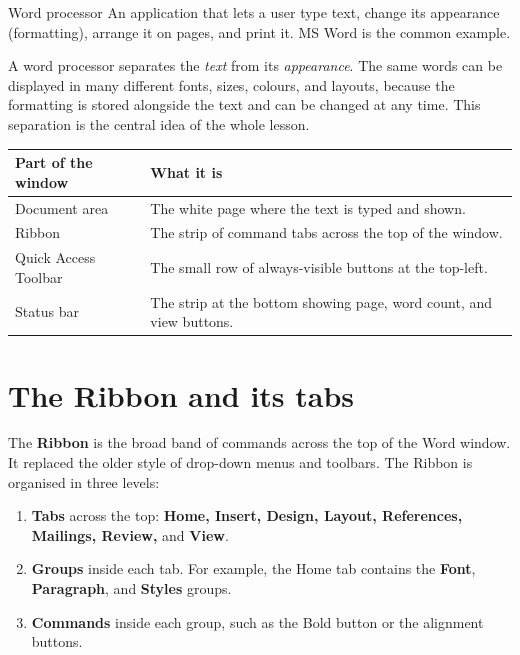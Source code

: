\begin{definitionbox}{Word processor}
An application that lets a user type text, change its appearance
(formatting), arrange it on pages, and print it. MS Word is the common
example.
\end{definitionbox}

A word processor separates the \emph{text} from its \emph{appearance}. The
same words can be displayed in many different fonts, sizes, colours, and
layouts, because the formatting is stored alongside the text and can be
changed at any time. This separation is the central idea of the whole
lesson.

\begin{center}
\begin{tabular}{p{}p{}}
\toprule
\textbf{Part of the window} & \textbf{What it is} \\
\midrule
Document area & The white page where the text is typed and shown. \\
Ribbon & The strip of command tabs across the top of the window. \\
Quick Access Toolbar & The small row of always-visible buttons at the top-left. \\
Status bar & The strip at the bottom showing page, word count, and view buttons. \\
\bottomrule
\end{tabular}
\end{center}

\section{The Ribbon and its tabs}
The \textbf{Ribbon} is the broad band of commands across the top of the Word
window. It replaced the older style of drop-down menus and toolbars. The
Ribbon is organised in three levels:

\begin{enumerate}
  \item \textbf{Tabs} across the top: \textbf{Home, Insert, Design, Layout,
    References, Mailings, Review,} and \textbf{View}.
  \item \textbf{Groups} inside each tab. For example, the Home tab contains
    the \textbf{Font}, \textbf{Paragraph}, and \textbf{Styles} groups.
  \item \textbf{Commands} inside each group, such as the Bold button or the
    alignment buttons.
\end{enumerate}

